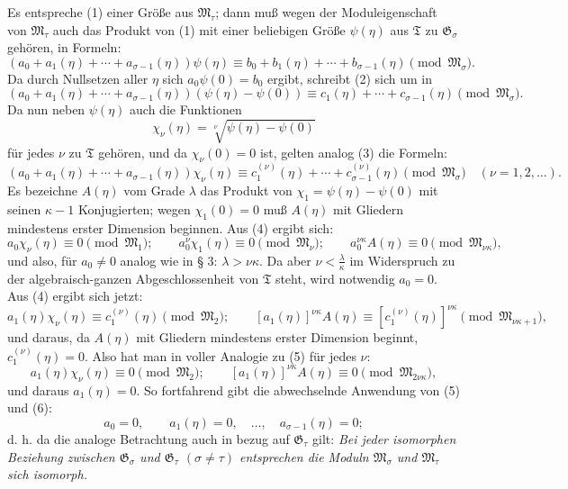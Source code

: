 \documentclass[11pt]{article}
\begin{document}
Es entspreche (1) einer Größe aus $\mathfrak M_\tau$; dann muß wegen der
Moduleigenschaft von $\mathfrak M_\tau$ auch das Produkt von (1) mit einer
beliebigen Größe $\psi(\eta)$ aus $\mathfrak T$ zu $\mathfrak G_\sigma$
gehören, in Formeln:
\begin{equation}
(a_0+a_1(\eta)+\cdots+a_{\sigma-1}(\eta))\psi(\eta)
\equiv b_0+b_1(\eta)+\cdots+b_{\sigma-1}(\eta)
\pmod{\mathfrak M_\sigma}.
\tag{2}
\end{equation}
Da durch Nullsetzen aller $\eta$ sich $a_0\psi(0)=b_0$ ergibt, schreibt (2) sich
um in
\begin{equation}
(a_0+a_1(\eta)+\cdots+a_{\sigma-1}(\eta))(\psi(\eta)-\psi(0))
\equiv c_1(\eta)+\cdots+c_{\sigma-1}(\eta)
\pmod{\mathfrak M_\sigma}.
\tag{3}
\end{equation}
Da nun neben $\psi(\eta)$ auch die Funktionen
\[
 \chi_\nu(\eta)=\sqrt[\nu]{\psi(\eta)-\psi(0)}
\]
für jedes $\nu$ zu $\mathfrak T$ gehören, und da $\chi_\nu(0)=0$ ist, gelten
analog (3) die Formeln:
\begin{equation}
(a_0+a_1(\eta)+\cdots+a_{\sigma-1}(\eta))\chi_\nu(\eta)
\equiv c_1^{(\nu)}(\eta)+\cdots+c_{\sigma-1}^{(\nu)}(\eta)
\pmod{\mathfrak M_\sigma}
\quad(\nu=1,2,\ldots).
\tag{4}
\end{equation}
Es bezeichne $A(\eta)$ vom Grade $\lambda$ das Produkt von
$\chi_1=\psi(\eta)-\psi(0)$ mit seinen $\kappa-1$ Konjugierten; wegen
$\chi_1(0)=0$ muß $A(\eta)$ mit Gliedern mindestens erster Dimension beginnen.
Aus (4) ergibt sich:
\begin{equation}
a_0\chi_\nu(\eta)\equiv0\pmod{\mathfrak M_1};\qquad
a_0^\nu\chi_1(\eta)\equiv0\pmod{\mathfrak M_\nu};\qquad
a_0^{\nu\kappa}A(\eta)\equiv0\pmod{\mathfrak M_{\nu\kappa}},
\tag{5}
\end{equation}
und also, für $a_0\ne0$ analog wie in § 3: $\lambda>\nu\kappa$. Da aber
$\nu<\frac{\lambda}{\kappa}$ im Widerspruch zu der algebraisch-ganzen
Abgeschlossenheit von $\mathfrak T$ steht, wird notwendig $a_0=0$. Aus (4)
ergibt sich jetzt:
\begin{equation}
a_1(\eta)\chi_\nu(\eta)\equiv c_1^{(\nu)}(\eta)\pmod{\mathfrak M_2};\qquad
[a_1(\eta)]^{\nu\kappa}A(\eta)
\equiv[c_1^{(\nu)}(\eta)]^{\nu\kappa}\pmod{\mathfrak M_{\nu\kappa+1}},
\tag{6}
\end{equation}
und daraus, da $A(\eta)$ mit Gliedern mindestens erster Dimension beginnt,
$c_1^{(\nu)}(\eta)=0$. Also hat man in voller Analogie zu (5) für jedes $\nu$:
\[
 a_1(\eta)\chi_\nu(\eta)\equiv0\pmod{\mathfrak M_2};\qquad
 [a_1(\eta)]^{\nu\kappa}A(\eta)\equiv0\pmod{\mathfrak M_{2\nu\kappa}},
\]
und daraus $a_1(\eta)=0$. So fortfahrend gibt die abwechselnde Anwendung von
(5) und (6):
\[
 a_0=0,\qquad a_1(\eta)=0,\quad \ldots,\quad a_{\sigma-1}(\eta)=0;
\]
d. h. da die analoge Betrachtung auch in bezug auf $\mathfrak G_\tau$ gilt:
\emph{Bei jeder isomorphen Beziehung zwischen $\mathfrak G_\sigma$ und
$\mathfrak G_\tau$ $(\sigma\ne\tau)$ entsprechen die Moduln $\mathfrak M_\sigma$
und $\mathfrak M_\tau$ sich isomorph.}
\end{document}
